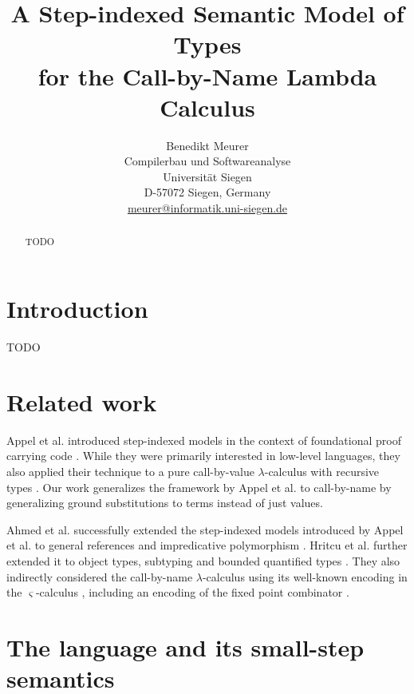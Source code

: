 \documentclass[10pt,a4paper,draft,twocolumn]{article}
\theoremstyle{definition}
\theoremstyle{plain}
\begin{document}
\author{%
  Benedikt Meurer\\
  Compilerbau und Softwareanalyse\\
  Universit\"at Siegen\\
  D-57072 Siegen, Germany\\
  \url{meurer@informatik.uni-siegen.de}
}
\date{}
\title{
  A Step-indexed Semantic Model of Types\\
  for the Call-by-Name Lambda Calculus
}
\maketitle

\begin{abstract}
  TODO
\end{abstract}


\section{Introduction}
\label{sec:Introduction}


TODO


\section{Related work}
\label{sec:Related_work}


Appel et al. introduced step-indexed models in the context of foundational proof carrying code \cite{Appel00}.
While they were primarily interested in low-level languages, they also applied their technique to a pure
call-by-value $\lambda$-calculus with recursive types \cite{Appel01}. Our work generalizes the framework
by Appel et al. to call-by-name by generalizing ground substitutions to terms instead of just values.

Ahmed et al. successfully extended the step-indexed models introduced by Appel et al. to general references
and impredicative polymorphism \cite{Ahmed04,Ahmed02}. Hritcu et al. further extended it to object types,
subtyping and bounded quantified types \cite{Hritcu07,Hritcu09}. They also indirectly considered the
call-by-name $\lambda$-calculus using its well-known encoding in the $\varsigma$-calculus \cite{AbadiCardelli96},
including an encoding of the fixed point combinator \cite{Fisher94}.


\section{The language and its small-step semantics}
\label{sec:The_language_and_its_small_step_semantics}
\end{document}

